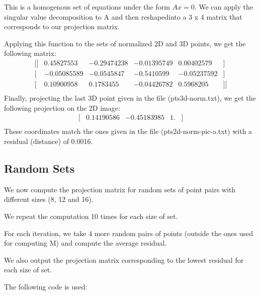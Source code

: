 \documentclass[a4paper,11pt]{article}
\begin{document}
This is a homogenous set of equations under the form $Ax = 0$. We can apply the singular value decomposition to A and then reshapedinto a 3 x 4 matrix that corresponds to our projection matrix.

\lstset{style=mystyle}



Applying this function to the sets of normalized 2D and 3D points, we get the following matrix:
$$
\begin{matrix}
[ [ &0.45827553 & -0.29474238  & -0.01395749  & 0.00402579& ]\\
 [ &-0.05085589 & -0.0545847 &  -0.5410599  & -0.05237592&]\\
 [ &0.10900958 & 0.1783455  & -0.04426782  & 0.5968205&]] \\
\end{matrix}
$$
Finally, projecting the last 3D point given in the file (pts3d-norm.txt), we get the following projection on the 2D image:
$$
\begin{matrix}
[ &0.14190586 & -0.45183985  & 1.  & ]\\
\end{matrix}
$$
These coordinates match the ones given in the file (pts2d-norm-pic-a.txt) with a residual (distance) of 0.0016.


\subsection{Random Sets}

We now compute the projection matrix for random sets of point pairs with different sizes (8, 12 and 16).

We repeat the computation 10 times for each size of set.

For each iteration, we take 4 more random pairs of points (outside the ones used for computing M) and compute the average residual.

We also output the projection matrix corresponding to the lowest residual for each size of set.

The following code is used:

\lstset{style=mystyle}

\end{document}
